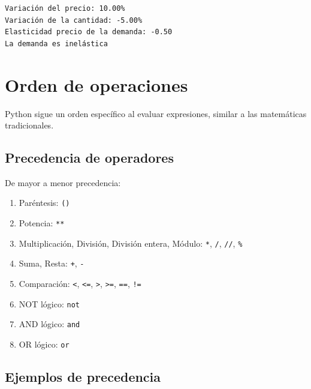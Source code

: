 \documentclass[
  doc,
  floatsintext,
  longtable,
  a4paper,
  nolmodern,
  notxfonts,
  notimes,
  12pt,
  colorlinks=true,linkcolor=blue,citecolor=blue,urlcolor=blue]{apa7}
\providecommand{\tightlist}{%
  \setlength{\itemsep}{0pt}\setlength{\parskip}{0pt}}
\begin{document}
\begin{verbatim}
Variación del precio: 10.00%
Variación de la cantidad: -5.00%
Elasticidad precio de la demanda: -0.50
La demanda es inelástica
\end{verbatim}

\section{Orden de operaciones}\label{orden-de-operaciones}

Python sigue un orden específico al evaluar expresiones, similar a las
matemáticas tradicionales.

\subsection{Precedencia de operadores}\label{precedencia-de-operadores}

De mayor a menor precedencia:

\begin{enumerate}
\def\labelenumi{\arabic{enumi}.}
\tightlist
\item
  Paréntesis: \texttt{()}
\item
  Potencia: \texttt{**}
\item
  Multiplicación, División, División entera, Módulo: \texttt{*},
  \texttt{/}, \texttt{//}, \texttt{\%}
\item
  Suma, Resta: \texttt{+}, \texttt{-}
\item
  Comparación: \texttt{\textless{}}, \texttt{\textless{}=},
  \texttt{\textgreater{}}, \texttt{\textgreater{}=}, \texttt{==},
  \texttt{!=}
\item
  NOT lógico: \texttt{not}
\item
  AND lógico: \texttt{and}
\item
  OR lógico: \texttt{or}
\end{enumerate}

\subsection{Ejemplos de precedencia}\label{ejemplos-de-precedencia}
\end{document}
